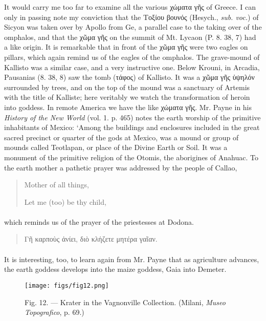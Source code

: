 \documentclass[a4paper, 11pt, oneside, polutonikogreek, english]{article}
\begin{document}
It would carry me too far to examine all the various χώματα γῆς of Greece. I can only in passing note my conviction that the Τοξίου βουνός (Hesych., \emph{sub. voc.}) of Sicyon was taken over by Apollo from Ge, a parallel case to the taking over of the omphalos, and that the χῶμα γῆς on the summit of Mt. Lycaon (P. 8. 38, 7) had a like origin. It is remarkable that in front of the χῶμα γῆς were two eagles on pillars, which again remind us of the eagles of the omphalos. The grave-mound of Kallisto was a similar case, and a very instructive one. Below Krouni, in Arcadia, Pausanias (8. 38, 8) saw the tomb (τάφος) of Kallisto. It was a χῶμα γῆς ὑψηλόν surrounded by trees, and on the top of the mound was a sanctuary of Artemis with the title of Kalliste; here veritably we watch the transformation of heroin into goddess. In remote America we have the like χώματα γῆς. Mr. Payne in his \emph{History of the New World} (vol. 1. p. 465) notes the earth worship of the primitive inhabitants of Mexico: `Among the buildings and enclosures included in the great sacred precinct or quarter of the gods at Mexico, was a mound or group of mounds called Teotlapan, or place of the Divine Earth or Soil. It was a monument of the primitive religion of the Otomis, the aborigines of Anahuac. To the earth mother a pathetic prayer was addressed by the people of Callao,
\begin{quotation}
Mother of all things,

Let me (too) be thy child,
\end{quotation}
\paragraph{}
which reminds us of the prayer of the priestesses at Dodona.
\begin{quotation}
Γῆ καρποὺς ἀνίει, διὸ κλήζετε μητέρα γαῖαν.
\end{quotation}
\paragraph{}
It is interesting, too, to learn again from Mr. Payne that as agriculture advances, the earth goddess develops into the maize goddess, Gaia into Demeter.
\begin{figure}[H]
\centering
\texttt{[image: figs/fig12.png]}
\caption{\Fontauri Fig. 12. --- Krater in the Vagnonville Collection. (Milani, \emph{Museo Topografico}, p. 69.)}
\end{figure}
\end{document}
